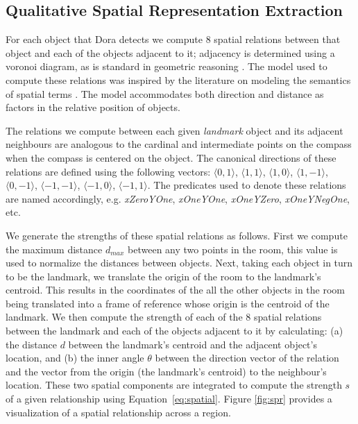 \subsection{Qualitative Spatial Representation Extraction}

For each object that Dora detects we compute 8 spatial relations between that object and each of the objects adjacent to it; adjacency is determined using a voronoi diagram, as is standard in geometric reasoning \cite{Forbus/etal2003}. The model used to compute these relations was inspired by the literature on modeling the semantics of spatial terms \cite{kelleher/costello:09,kelleher/vanGenabith:2006,regier/carlson:2001,gapp:1994}. The model accommodates both direction and distance as factors in the relative position of objects. 

The relations we compute between each given \emph{landmark} object and its adjacent neighbours are analogous to the cardinal and intermediate points on the compass when the compass is centered on the object. The canonical directions of these relations are defined using the following vectors: $\langle0,1\rangle$, $\langle1,1\rangle$, $\langle1,0\rangle$, $\langle1,-1\rangle$, $\langle0,-1\rangle$, $\langle-1,-1\rangle$, $\langle-1,0\rangle$, $\langle-1,1\rangle$. The predicates used to denote these relations are named accordingly, e.g. \textit{xZeroYOne}, \textit{xOneYOne}, \textit{xOneYZero}, \textit{xOneYNegOne}, etc.

We generate the strengths of these spatial relations as follows. First we compute the maximum distance $d_{max}$ between any two points in the room, this value is used to normalize the distances between objects. Next, taking each object in turn to be the landmark, we translate the origin of the room to the landmark's centroid. This results in the coordinates of the all the other objects in the room being translated into a frame of reference whose origin is the centroid of the landmark.  We then compute the strength of each of the 8 spatial relations between the landmark and each of the objects adjacent to it by calculating: (a) the distance $d$ between the landmark's centroid and the adjacent object's location, and (b) the inner angle $\theta$ between the direction vector of the relation and the vector from the origin (the landmark's centroid) to the neighbour's location. These two spatial components are integrated to compute the strength $s$ of a given relationship using Equation~\ref{eq:spatial}. Figure \ref{fig:spr} provides a visualization of a spatial relationship across a region. 

